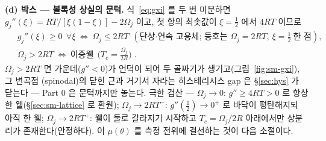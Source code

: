 \documentclass[11pt,a4paper]{article}
\begin{document}
\textbf{(d) 박스 --- 볼록성 상실의 문턱.} 식~\eqref{eq:gxi} 를 두 번 미분하면
$g_j''(\xi)=RT/[\xi(1-\xi)]-2\Omega_j$ 이고, 첫 항의 최솟값이 $\xi=\tfrac12$ 에서 $4RT$ 이므로
\begin{equation}
\boxed{\;
\begin{aligned}
&g_j''(\xi)\ge0\ \ \forall\xi\ \Longleftrightarrow\ \Omega_j\le2RT\ \ (\text{단상·연속 고용체; 등호는 }\Omega_j{=}2RT,\ \xi{=}\tfrac12\ \text{한 점}),\\
&\Omega_j>2RT\ \Longleftrightarrow\ \text{이중웰}\ \ \Big(T_c=\frac{\Omega_j}{2R}\Big)\;.
\end{aligned}}
\label{eq:sm-thresh}
\end{equation}
$\Omega_j>2RT$ 면 가운데($g''<0$)가 언덕이 되어 두 골짜기가 생기고(그림~\ref{fig:sm-gxi}), 그 변곡점
(spinodal)의 닫힌 근과 거기서 자라는 히스테리시스 gap 은 \S\ref{sec:hys} 가 닫는다 --- Part 0 은 문턱까지만
놓는다. 극한 검산 --- $\Omega_j\to0$: $g''\ge4RT>0$ 로 항상 한 웰(\S\ref{sec:sm-lattice} 로 환원);
$\Omega_j\to2RT^-$: $g''(\tfrac12)\to0^+$ 로 바닥이 평탄해지되 아직 한 웰; $\Omega_j\to2RT^+$: 웰이 둘로
갈라지기 시작하고 $T_c=\Omega_j/2R$ 아래에서만 상분리가 존재한다(안정하다). 이 $\mu(\theta)$ 를 측정 전위에 결선하는
것이 다음 소절이다.
\end{document}
